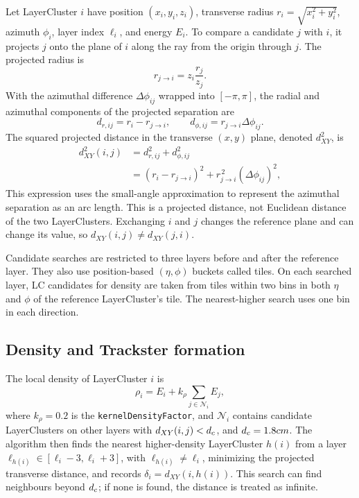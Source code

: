 Let LayerCluster $i$ have position $(x_i,y_i,z_i)$, transverse radius
$r_i=\sqrt{x_i^2+y_i^2}$, azimuth $\phi_i$, layer index $\ell_i$, and energy
$E_i$.
To compare a candidate $j$ with $i$, it projects $j$ onto the plane of $i$
along the ray from the origin through $j$. The projected radius is
\begin{equation}
  r_{j\to i}=z_i\frac{r_j}{z_j}.
\end{equation}
With the azimuthal difference $\Delta\phi_{ij}$ wrapped into $[-\pi,\pi]$,
the radial and azimuthal components of the projected separation are
\begin{equation}
  d_{r,ij}=r_i-r_{j\to i},
  \qquad
  d_{\phi,ij}=r_{j\to i}\Delta\phi_{ij}.
\end{equation}
The squared projected distance in the transverse $(x,y)$ plane, denoted
$d_{XY}^2$, is
\begin{equation}
  \begin{aligned}
  d_{XY}^2(i,j)
    &= d_{r,ij}^2+d_{\phi,ij}^2 \\
    &= (r_i-r_{j\to i})^2
       +r_{j\to i}^{\,2}(\Delta\phi_{ij})^2,
  \end{aligned}
  \label{eq:clueprojective}
\end{equation}
This expression uses the small-angle approximation to represent the azimuthal
separation as an arc length.
This is a projected distance, not Euclidean distance of the two LayerClusters. Exchanging $i$ and
$j$ changes the reference plane and can change its value, so $d_{XY}(i,j) \neq d_{XY}(j,i)$.

Candidate searches are restricted to three layers
before and after the reference layer. They also use position-based
$(\eta,\phi)$ buckets called tiles. On each searched layer, LC candidates for density
are taken from tiles within two bins in both $\eta$ and $\phi$ of the reference
LayerCluster's tile. The nearest-higher search uses one bin in each direction.

\subsection{Density and Trackster formation}

The local density of LayerCluster $i$ is
\begin{equation}
  \rho_i=E_i+k_\rho\sum_{j\in\mathcal{N}_i}E_j,
  \label{eq:cluedensity}
\end{equation}
where $k_\rho=0.2$ is the \texttt{kernelDensityFactor}, and $\mathcal{N}_i$
contains candidate LayerClusters on other layers with
$d_{XY}(i,j)<d_{c}$, and $d_{c}=1.8 cm$. The algorithm then finds the
nearest higher-density LayerCluster $h(i)$ from a layer
$\ell_{h(i)}\in[\ell_i-3,\ell_i+3]$, with $\ell_{h(i)}\neq\ell_i$, minimizing
the projected transverse distance, and records
$\delta_i=d_{XY}(i,h(i))$. This search can find neighbours beyond $d_{c}$;
if none is found, the distance is treated as infinite.

